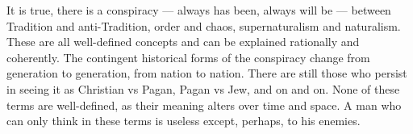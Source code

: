 It is true, there is a conspiracy --- always has been, always will be --- between Tradition and anti-Tradition, order and chaos, supernaturalism and naturalism. These are all well-defined concepts and can be explained rationally and coherently. The contingent historical forms of the conspiracy change from generation to generation, from nation to nation. There are still those who persist in seeing it as Christian vs Pagan, Pagan vs Jew, and on and on. None of these terms are well-defined, as their meaning alters over time and space. A man who can only think in these terms is useless except, perhaps, to his enemies.



